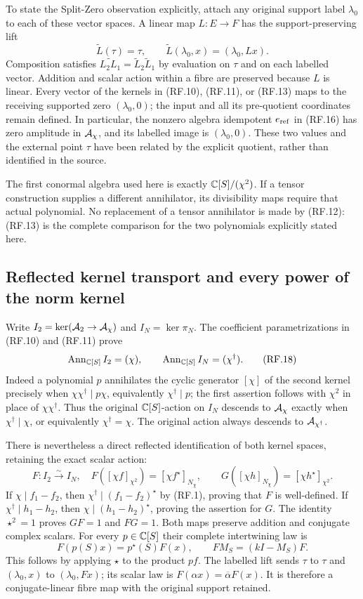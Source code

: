 To state the Split-Zero observation explicitly, attach any original
support label $\lambda_0$ to each of these vector spaces. A linear
map $L:E\to F$ has the support-preserving lift
\[
 \widetilde L(\tau)=\tau,\qquad
 \widetilde L(\lambda_0,x)=(\lambda_0,Lx).
 \tag{RF.17}
\]
Composition satisfies $\widetilde{L_2L_1}
=\widetilde L_2\widetilde L_1$ by evaluation on $\tau$ and on
each labelled vector. Addition and scalar action within a fibre
are preserved because $L$ is linear. Every vector of the kernels
in (RF.10), (RF.11), or (RF.13) maps to the receiving supported
zero $(\lambda_0,0)$; the input and all its pre-quotient coordinates
remain defined. In particular, the nonzero algebra idempotent
$e_{\rm ref}$ in (RF.16) has zero amplitude in $\mathcal A_\chi$, and
its labelled image is $(\lambda_0,0)$. These two values and the
external point $\tau$ have been related by the explicit quotient,
rather than identified in the source.

The first conormal algebra used here is exactly $\mathbb C[S]/(\chi^2)$.
If a tensor construction supplies a different annihilator, its
divisibility maps require that actual polynomial. No replacement
of a tensor annihilator is made by (RF.12): (RF.13) is the complete
comparison for the two polynomials explicitly stated here.

\subsection{Reflected kernel transport and every power of the norm kernel}

Write $I_2=\ker(\mathcal A_2\to\mathcal A_\chi)$ and $I_N=\ker\pi_N$.
The coefficient parametrizations in (RF.10) and (RF.11) prove
\[
 \operatorname{Ann}_{\mathbb C[S]}I_2=(\chi),\qquad
 \operatorname{Ann}_{\mathbb C[S]}I_N=(\chi^\dagger).
 \tag{RF.18}
\]
Indeed a polynomial $p$ annihilates the cyclic generator $[\chi]$
of the second kernel precisely when $\chi\chi^\dagger\mid p\chi$,
equivalently $\chi^\dagger\mid p$; the first assertion follows
with $\chi^2$ in place of $\chi\chi^\dagger$. Thus the original
$\mathbb C[S]$-action on $I_N$ descends to $\mathcal A_\chi$ exactly when
$\chi^\dagger\mid\chi$, or equivalently $\chi^\dagger=\chi$.
The original action always descends to $\mathcal A_{\chi^\dagger}$.

There is nevertheless a direct reflected identification of both
kernel spaces, retaining the exact scalar action:
\[
 F:I_2\xrightarrow{\sim}I_N,\quad
 F([\chi f]_{\chi^2})=[\chi f^\star]_{N_\chi},\qquad
 G([\chi h]_{N_\chi})=[\chi h^\star]_{\chi^2}.
 \tag{RF.19}
\]
If $\chi\mid f_1-f_2$, then $\chi^\dagger\mid(f_1-f_2)^\star$
by (RF.1), proving that $F$ is well-defined. If
$\chi^\dagger\mid h_1-h_2$, then
$\chi\mid(h_1-h_2)^\star$, proving the assertion for $G$.
The identity $\star^2=1$ proves $GF=1$ and $FG=1$.
Both maps preserve addition and conjugate complex scalars.
For every $p\in\mathbb C[S]$ their complete intertwining law is
\[
 F(p(S)x)=p^\star(S)F(x),\qquad
 FM_S=(kI-M_S)F.
 \tag{RF.20}
\]
This follows by applying $\star$ to the product $pf$. The
labelled lift sends $\tau$ to $\tau$ and $(\lambda_0,x)$ to
$(\lambda_0,Fx)$; its scalar law is
$F(\alpha x)=\overline\alpha F(x)$. It is therefore a
conjugate-linear fibre map with the original support retained.

